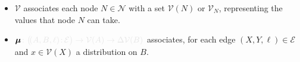 \documentclass{article}
\newcommand{\notation}[2][]{#1}
\renewcommand{\notation}[2][]{{\color{notationcolor} #2}}
\newcommand{\bmu}{\boldsymbol{\mu}}
\newcommand{\V}{\mathcal V}
\newcommand{\Ed}{\mathcal E}
\newcommand{\MN}{PDG}
\numberwithin{equation}{section}
\begin{document}
\begin{defn}[\MN]
\begin{itemize}[nosep]
			\item $\V$ associates each node $N \in \mathcal N$ with a set $\V(N)$ or $\V_N$, representing the values that node $N$ can take.
			\item $\bmu\notation{\colon \big(\!({A,B,\ell})\colon \! \Ed \big) \to \V(A) \to \Delta\V(B)}$
			associates, for each edge $(X,Y, \ell) \in \Ed$ and $x \in \V(X)$ a distribution on $B$.

		\end{itemize}
		
	\end{defn}
\end{document}
